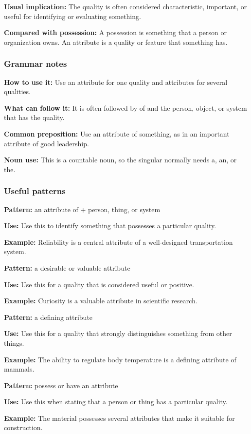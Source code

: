 \documentclass[11pt]{article}
\begin{document}
\textbf{Usual implication:} The quality is often considered characteristic, important, or useful for identifying or evaluating something.

\textbf{Compared with possession:} A possession is something that a person or organization owns. An attribute is a quality or feature that something has.

\subsubsection{Grammar notes}
\textbf{How to use it:} Use an attribute for one quality and attributes for several qualities.

\textbf{What can follow it:} It is often followed by of and the person, object, or system that has the quality.

\textbf{Common preposition:} Use an attribute of something, as in an important attribute of good leadership.

\textbf{Noun use:} This is a countable noun, so the singular normally needs a, an, or the.

\subsubsection{Useful patterns}
\textbf{Pattern:} an attribute of + person, thing, or system

\textbf{Use:} Use this to identify something that possesses a particular quality.

\textbf{Example:} Reliability is a central attribute of a well-designed transportation system.

\textbf{Pattern:} a desirable or valuable attribute

\textbf{Use:} Use this for a quality that is considered useful or positive.

\textbf{Example:} Curiosity is a valuable attribute in scientific research.

\textbf{Pattern:} a defining attribute

\textbf{Use:} Use this for a quality that strongly distinguishes something from other things.

\textbf{Example:} The ability to regulate body temperature is a defining attribute of mammals.

\textbf{Pattern:} possess or have an attribute

\textbf{Use:} Use this when stating that a person or thing has a particular quality.

\textbf{Example:} The material possesses several attributes that make it suitable for construction.
\end{document}

